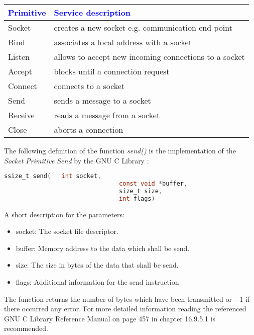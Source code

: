 \documentclass[xcolor=dvipsnames]{article}
\begin{document}
\begin{center}
\begin{tabular}{ | l | l | } 
\hline
\textcolor{blue}{Primitive} & \textcolor{blue}{Service description}\\
\hline
Socket & creates a new socket e.g. communication end point\\
Bind & associates a local address with a socket\\
Listen & allows to accept new incoming connections to a socket\\
Accept & blocks until a connection request\\
Connect & connects to a socket\\
Send & sends a message to a socket\\
Receive & reads a message from a socket\\
Close & aborts a connection\\
\hline
\end{tabular}
\end{center}
\label{tab:tcp_primitives}

\noindent The following definition of the function \textit{send()} is the implementation of the \textit{Socket Primitive} \textit{Send} by the GNU C Library \cite[p. 457, ch. 16.9.5.1]{GNU_C_library_manual}:

\begin{lstlisting}[language=C, numbers=none]
ssize_t send(  	int socket, 
								const void *buffer, 
								size_t size, 
								int flags)
\end{lstlisting}

\noindent A short description for the parameters:

\begin{itemize}
\item socket: The socket file descriptor.
\item buffer: Memory address to the data which shall be send.
\item size: The size in bytes of the data that shall be send.
\item flags: Additional information for the send instruction \cite[p. 459, ch. 16.9.5.3]{GNU_C_library_manual}
\end{itemize}

\noindent The function returns the number of bytes which have been transmitted or $-1$ if there occurred any error. For more detailed information reading the referenced GNU C Library Reference Manual \cite{GNU_C_library_manual} on page 457 in chapter 16.9.5.1 is recommended.\\
\end{document}
